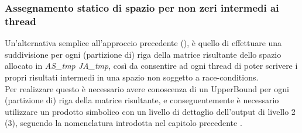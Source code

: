 \subsubsection[Assegnamento statico\\di spazio intermedio ai thread]
{Assegnamento statico  di spazio per non zeri intermedi ai thread} \label{chSpMMNum:preSplitAS_JA_tmp}
Un'alternativa semplice all'approccio precedente (),
è quello di effettuare una suddivisione per ogni (partizione di) riga della matrice risultante
dello spazio allocato in \emph{AS\_tmp JA\_tmp}, così da consentire ad ogni thread 
di poter scrivere i propri risultati intermedi in una spazio non soggetto a race-conditions.\\
Per realizzare questo è necessario avere conoscenza di un UpperBound per ogni (partizione di)
riga della matrice risultante, e conseguentemente è necessario utilizzare un prodotto simbolico
con un livello di dettaglio dell'output di livello 2 (3), 
seguendo la nomenclatura introdotta nel capitolo precedente .\\

